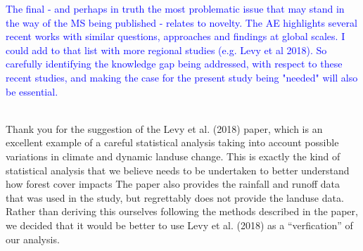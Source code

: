 \documentclass[]{elsarticle} %
\begin{document}
\textcolor{blue}{The final - and perhaps in truth the most problematic issue that may stand in the way of the MS being published - relates to novelty.  The AE highlights several recent works with similar questions, approaches and findings at global scales.  I could add to that list with more regional studies (e.g. Levy et al 2018).  So carefully identifying the knowledge gap being addressed, with respect to these recent studies, and making the case for the present study being "needed" will also be essential.}\\
\strut \\

Thank you for the suggestion of the Levy et al. (2018) paper, which is an excellent example of a careful statistical analysis taking into account possible variations in climate and dynamic landuse change. This is exactly the kind of statistical analysis that we believe needs to be undertaken to better understand how forest cover impacts The paper also provides the rainfall and runoff data that was used in the study, but regrettably does not provide the landuse data. Rather than deriving this ourselves following the methods described in the paper, we decided that it would be better to use Levy et al. (2018) as a ``verfication'' of our analysis.
\end{document}
